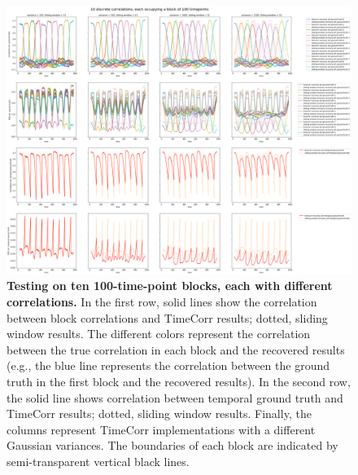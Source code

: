 \documentclass[11pt]{article}
\begin{document}
\begin{enumerate}
\begin{figure}[!htb]
\includegraphics[width=1\textwidth]{../figures/SyntheticTesting/10block100t.png}
\caption{\textbf{Testing on ten 100-time-point blocks, each with different correlations.} In the first row, solid lines show the correlation between block correlations and TimeCorr results; dotted, sliding window results. The different colors represent the correlation between the true correlation in each block and the recovered results (e.g., the blue line represents the correlation between the ground truth in the first block and the recovered results). In the second row, the solid line shows correlation between temporal ground truth and TimeCorr results; dotted, sliding window results. Finally, the columns represent TimeCorr implementations with a different Gaussian variances. The boundaries of each block are indicated by semi-transparent vertical black lines.}
\label{fig:10block100t}
\end{figure}


\end{enumerate}
\end{document}
